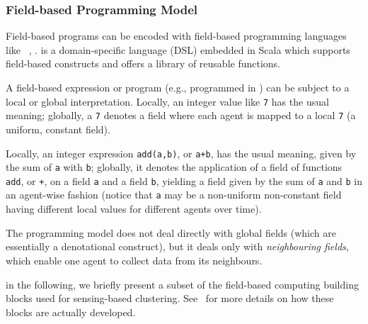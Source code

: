 \subsubsection{Field-based Programming Model}
\label{sec:field-based-programming-model}

Field-based programs can be encoded with field-based programming languages like \scafi{}~\cite{DBLP:conf/isola/CasadeiVAD20}, .
%
\scafi{} is a domain-specific language (DSL) embedded in Scala
 which supports field-based constructs
 and offers a library of reusable functions.
%


A field-based expression or program (e.g., programmed in \scafi{}) can be subject
 to a local or global interpretation.
%
Locally, an integer value like \texttt{7} has the usual meaning;
 globally, a \texttt{7} denotes a field where each agent is mapped to a local \texttt{7} (a uniform, constant field).
%

Locally, an integer expression \texttt{add(a,b)}, or \texttt{a+b}, has the usual meaning, given by the sum of \texttt{a} with \texttt{b};
 globally, it denotes the application of a field of functions \texttt{add}, or \texttt{+},
 on a field \texttt{a} and a field \texttt{b},
 yielding a field given by the sum of \texttt{a} and \texttt{b}
 in an agent-wise fashion (notice that \texttt{a} may be a non-uniform non-constant field having different local values for different agents over time).

The programming model does not deal directly with global fields (which are essentially a denotational construct),
 but it deals only with \emph{neighbouring fields},
 which enable one agent to collect data from its neighbours.

%
 in the following, we  briefly present a subset of the field-based computing building blocks used for sensing-based clustering.
%
See~\cite{DBLP:journals/jlap/ViroliBDACP19} for more details on how these blocks are actually developed.

